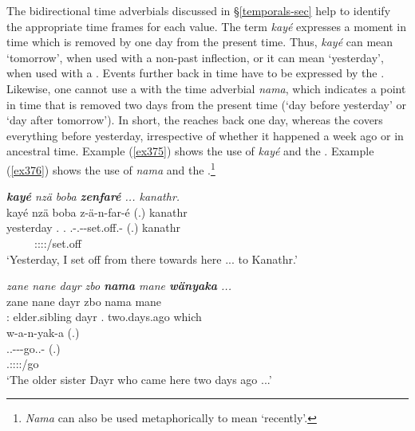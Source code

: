 The bidirectional time adverbials discussed in {\S}\ref{temporals-sec} help to identify the appropriate time frames for each  value. The term \emph{kayé} expresses a moment in time which is removed by one day from the present time. Thus, \emph{kayé} can mean `tomorrow', when used with a non-past inflection, or it can mean `yesterday', when used with a . Events further back in time have to be expressed by the  . Likewise, one cannot use a  with the time adverbial \emph{nama}, which indicates a point in time that is removed two days from the present time (`day before yesterday' or `day after tomorrow'). In short, the  reaches back one day, whereas the   covers everything before yesterday, irrespective of whether it happened a week ago or in ancestral time. Example (\ref{ex375}) shows the use of \emph{kayé} and the . Example (\ref{ex376}) shows the use of \emph{nama} and the  .\footnote{\emph{Nama} can also be used metaphorically to mean `recently'.}

\begin{exe}
  	\ex \emph{\textbf{kayé} nzä boba \textbf{zenfaré} ... kanathr.}\\
  	\glll kayé nzä boba z-ä-n-far-é (.) kanathr\\
	yesterday \Fsg.{\Abs} \Med.{\Abl} \M.\Gam-\Vc.\Ndu-\Venit-set.off.\Ext-\Fsg{} (.) kanathr\\
 	~ ~ ~ {\footnotesize \Fsg:\Sbj:\Rpst:\Pfv:\Venit/set.off} ~ ~\\
  	\trans `Yesterday, I set off from there towards here ... to Kanathr.'
  	\label{ex375}
\end{exe}
\begin{exe}
	\ex \emph{zane nane dayr zbo \textbf{nama} mane \textbf{wänyaka} ...}\\
	\gll zane nane dayr zbo nama mane\\
	\Dem:{\Prox} elder.sibling dayr \Prox.{\All} two.days.ago which\\
	\sn
	\glll w-a-n-yak-a (.)\\
	\Tsg.\F.\Alph-\Vc-\Venit-go.\Ext.\Ndu-\Pst{} (.)\\
	{\footnotesize \Tsg.\F:\Sbj:\Pst:\Ipfv:\Venit/go} ~\\
	\trans `The older sister Dayr who came here two days ago ...'
	\label{ex376}
\end{exe}


